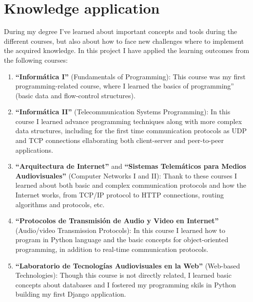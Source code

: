 \documentclass[a4paper, 12pt]{book}
\begin{document}
\section{Knowledge application}
\label{sec:knowledge-application}
During my degree I've learned about important concepts and tools during the different courses,
but also about how to face new challenges where to implement the acquired knowledge.
In this project I have applied the learning outcomes from the following courses:
\begin{enumerate}
  \item \textbf{``Informática I''} (Fundamentals of Programming): This course was my first programming-related course,
  where I learned the basics of programming'' (basic data and flow-control structures).
  \item \textbf{``Informática II''} (Telecommunication Systems Programming): In this course I learned advance programming
  techniques along with more complex data structures, including for the first time communication protocols as UDP and TCP connections
  ellaborating both client-server and peer-to-peer applications.
  \item \textbf{``Arquitectura de Internet''} and \textbf{``Sistemas Telemáticos para Medios Audiovisuales''} (Computer Networks I and II):
  Thank to these courses I learned about both basic and complex communication protocols and how the Internet works,
  from TCP/IP protocol to HTTP connections, routing algorithms and protocols, etc.
  \item \textbf{``Protocolos de Transmisión de Audio y Video en Internet''} (Audio/video Transmission Protocols):
  In this course I learned how to program in Python language and the basic concepts for object-oriented programming, in
  addition to real-time communication protocols.
  \item \textbf{``Laboratorio de Tecnologías Audiovisuales en la Web''} (Web-based Technologies): Though this course is not directly
  related, I learned basic concepts about databases and I fostered my programming skils in Python building my first Django
  application.
\end{enumerate}
\end{document}
